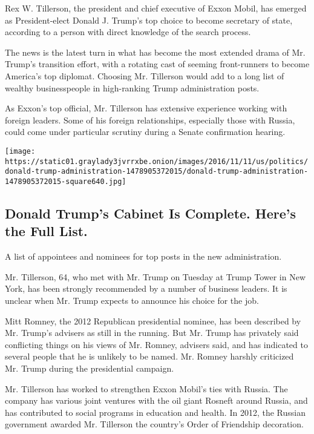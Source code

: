 Rex W. Tillerson, the president and chief executive of Exxon Mobil, has
emerged as President-elect Donald J. Trump's top choice to become
secretary of state, according to a person with direct knowledge of the
search process.

The news is the latest turn in what has become the most extended drama
of Mr. Trump's transition effort, with a rotating cast of seeming
front-runners to become America's top diplomat. Choosing Mr. Tillerson
would add to a long list of wealthy businesspeople in high-ranking Trump
administration posts.

As Exxon's top official, Mr. Tillerson has extensive experience working
with foreign leaders. Some of his foreign relationships, especially
those with Russia, could come under particular scrutiny during a Senate
confirmation hearing.

\href{https://www.nytimes3xbfgragh.onion/interactive/2016/us/politics/donald-trump-administration.html}{}

\texttt{[image: https://static01.graylady3jvrrxbe.onion/images/2016/11/11/us/politics/donald-trump-administration-1478905372015/donald-trump-administration-1478905372015-square640.jpg]}

\hypertarget{donald-trumps-cabinet-is-complete-heres-the-full-list}{%
\subsection{Donald Trump's Cabinet Is Complete. Here's the Full
List.}\label{donald-trumps-cabinet-is-complete-heres-the-full-list}}

A list of appointees and nominees for top posts in the new
administration.

Mr. Tillerson, 64, who met with Mr. Trump on Tuesday at Trump Tower in
New York, has been strongly recommended by a number of business leaders.
It is unclear when Mr. Trump expects to announce his choice for the job.

Mitt Romney, the 2012 Republican presidential nominee, has been
described by Mr. Trump's advisers as still in the running. But Mr. Trump
has privately said conflicting things on his views of Mr. Romney,
advisers said, and has indicated to several people that he is unlikely
to be named. Mr. Romney harshly criticized Mr. Trump during the
presidential campaign.

Mr. Tillerson has worked to strengthen Exxon Mobil's ties with Russia.
The company has various joint ventures with the oil giant Rosneft around
Russia, and has contributed to social programs in education and health.
In 2012, the Russian government awarded Mr. Tillerson the country's
Order of Friendship decoration.

